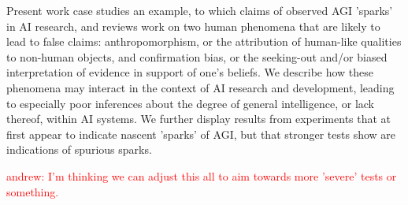 \documentclass{article}
\theoremstyle{plain}
\theoremstyle{definition}
\theoremstyle{remark}
\begin{document}
Present work case studies an example, to which claims of observed AGI 'sparks' in AI research, and reviews work on two human phenomena that are likely to lead to false claims: anthropomorphism, or the attribution of human-like qualities to non-human objects, and confirmation bias, or the seeking-out and/or biased interpretation of evidence in support of one's beliefs. We describe how these phenomena may interact in the context of AI research and development, leading to especially poor inferences about the degree of general intelligence, or lack thereof, within AI systems. We further display results from experiments that at first appear to indicate nascent 'sparks' of AGI, but that stronger tests show are indications of spurious sparks. 

\textcolor{red}{andrew: I'm thinking we can adjust this all to aim towards more 'severe' tests or something. }


\end{document}
